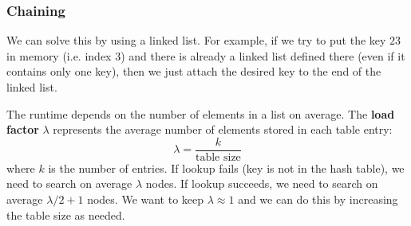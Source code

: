 \documentclass{article}
\begin{document}
    \subsubsection{Chaining}
    We can solve this by using a linked list. For example, if we try to put the key $23$ in memory (i.e. index $3$) and there is already a linked list defined there (even if it contains only one key), then we just attach the desired key to the end of the linked list.

    The runtime depends on the number of elements in a list on average. The \textbf{load factor} $\lambda$ represents the average number of elements stored in each table entry:
    \begin{equation}
        \lambda = \frac{k}{\text{table size}}
    \end{equation}
    where $k$ is the number of entries. If lookup fails (key is not in the hash table), we need to search on average $\lambda$ nodes. If lookup succeeds, we need to search on average $\lambda/2+1$ nodes. We want to keep $\lambda \approx 1$ and we can do this by increasing the table size as needed.
\end{document}
